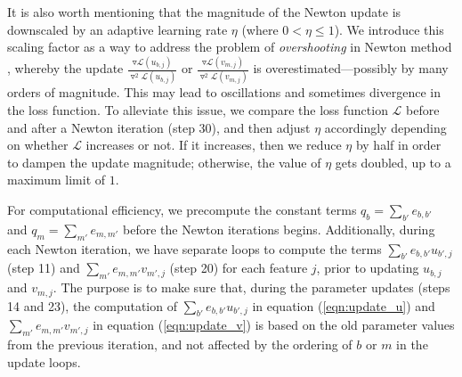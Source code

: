 It is also worth mentioning that the magnitude of the Newton update is downscaled by an adaptive learning rate $\eta$ (where $0 < \eta \leq 1$). We introduce this scaling factor as a way to address the problem of \emph{overshooting} in Newton method \cite{Bank1981}, whereby the update $\frac{ \triangledown \mathcal{L}(u_{b,j}) }{ \triangledown^2 \mathcal{L}(u_{b,j}) }$ or $\frac{ \triangledown \mathcal{L}(v_{m,j}) }{ \triangledown^2 \mathcal{L}(v_{m,j}) }$ is overestimated---possibly by many orders of magnitude. This may lead to oscillations and sometimes divergence in the loss function. To alleviate this issue, we compare the loss function $\mathcal{L}$ before and after a Newton iteration (step 30), and then adjust $\eta$ accordingly depending on whether $\mathcal{L}$ increases or not. If it increases, then we reduce $\eta$ by half in order to dampen the update magnitude; otherwise, the value of $\eta$ gets doubled, up to a maximum limit of $1$.

For computational efficiency, we precompute the constant terms $q_b = \sum_{b'} e_{b,b'}$ and $q_m = \sum_{m'} e_{m,m'}$ before the Newton iterations begins. Additionally, during each Newton iteration, we have separate loops to compute the terms $\sum_{b'} e_{b,b'} u_{b',j}$ (step 11) and $\sum_{m'} e_{m,m'} v_{m',j}$ (step 20) for each feature $j$, prior to updating $u_{b,j}$ and $v_{m,j}$. The purpose is to make sure that, during the parameter updates (steps 14 and 23), the computation of $\sum_{b'} e_{b,b'} u_{b',j}$ in equation (\ref{eqn:update_u}) and $\sum_{m'} e_{m,m'} v_{m',j}$ in equation (\ref{eqn:update_v}) is based on the old parameter values from the previous iteration, and not affected by the ordering of $b$ or $m$ in the update loops.



